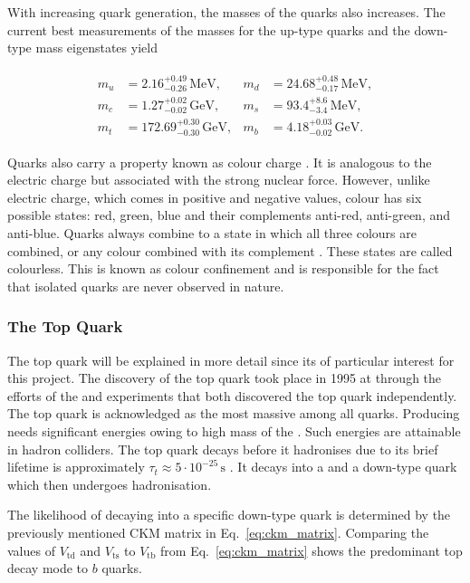 \documentclass[bachelor,ngerman,english]{GAUBM}
\begin{document}
With increasing quark generation, the masses of the quarks also increases. The current best measurements of the masses for the up-type quarks and the down-type mass eigenstates \cite{pdg} yield 

\begin{gather}
    \begin{aligned}
        m_u &= 2.16^{+0.49}_{-0.26}\,\text{MeV},    & m_d &= 24.68^{+0.48}_{-0.17}\,\text{MeV},\\
        m_c &= 1.27^{+0.02}_{-0.02}\,\text{GeV},    & m_s &= 93.4^{+8.6}_{-3.4}\,\text{MeV},\\
        m_t &= 172.69^{+0.30}_{-0.30}\,\text{GeV},  & m_b &= 4.18^{+0.03}_{-0.02}\,\text{GeV}.
        \label{eq:mass_quarks}
    \end{aligned}
\end{gather}

Quarks also carry a property known as colour charge \cite{theory:qcd_01,theory:qcd_02}. It is analogous to the electric charge but associated with the strong nuclear force. However, unlike electric charge, which comes in positive and negative values, colour has six possible states: red, green, blue and their complements anti-red, anti-green, and anti-blue. Quarks always combine to a state in which all three colours are combined, or any colour combined with its complement \cite{theory:qcd_02}. These states are called colourless. This is known as colour confinement and is responsible for the fact that isolated quarks are never observed in nature.

\subsubsection*{The Top Quark}
The top quark will be explained in more detail since its of particular interest for this project. The discovery of the top quark took place in 1995 at \fermilab through the efforts of the \dzero \cite{theory:top_discovery_01} and \cdf \cite{theory:top_discovery_02} experiments that both discovered the top quark independently. The top quark is acknowledged as the most massive among all quarks. Producing \tquarks needs significant energies owing to high mass of the \tquark. Such energies are attainable in hadron colliders. The top quark decays before it hadronises due to its brief lifetime is approximately $\tau_t\approx5\cdot10^{-25}\,\text{s}$ \cite{pdg}. It decays into a \wboson and a down-type quark which then undergoes hadronisation. 

The likelihood of decaying into a specific down-type quark is determined by the previously mentioned CKM matrix in Eq.~\ref{eq:ckm_matrix}. Comparing the values of $V_\text{td}$ and $V_\text{ts}$ to $V_\text{tb}$ from Eq.~\ref{eq:ckm_matrix} shows the predominant top decay mode to $b$ quarks.
 
\end{document}
